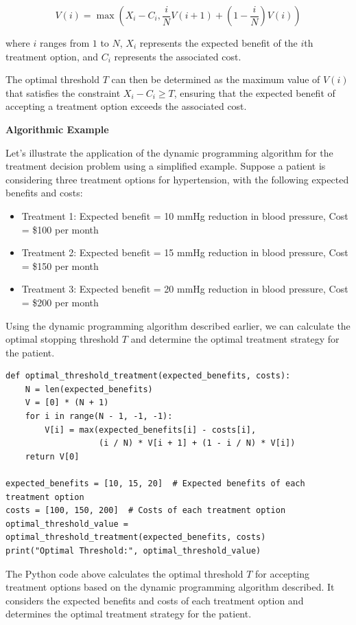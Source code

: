 \documentclass[12pt]{book} %
\begin{document}
\[
V(i) = \max\left(X_i - C_i, \frac{i}{N}V(i+1) + \left(1 - \frac{i}{N}\right)V(i)\right)
\]

where \(i\) ranges from \(1\) to \(N\), \(X_i\) represents the expected benefit of the \(i\)th treatment option, and \(C_i\) represents the associated cost.

The optimal threshold \(T\) can then be determined as the maximum value of \(V(i)\) that satisfies the constraint \(X_i - C_i \geq T\), ensuring that the expected benefit of accepting a treatment option exceeds the associated cost.

\textbf{Algorithmic Example}

Let's illustrate the application of the dynamic programming algorithm for the treatment decision problem using a simplified example. Suppose a patient is considering three treatment options for hypertension, with the following expected benefits and costs:

\begin{itemize}
    \item Treatment 1: Expected benefit = 10 mmHg reduction in blood pressure, Cost = \$100 per month
    \item Treatment 2: Expected benefit = 15 mmHg reduction in blood pressure, Cost = \$150 per month
    \item Treatment 3: Expected benefit = 20 mmHg reduction in blood pressure, Cost = \$200 per month
\end{itemize}

Using the dynamic programming algorithm described earlier, we can calculate the optimal stopping threshold \(T\) and determine the optimal treatment strategy for the patient.

\FloatBarrier
\begin{lstlisting}
def optimal_threshold_treatment(expected_benefits, costs):
    N = len(expected_benefits)
    V = [0] * (N + 1)
    for i in range(N - 1, -1, -1):
        V[i] = max(expected_benefits[i] - costs[i], 
                   (i / N) * V[i + 1] + (1 - i / N) * V[i])
    return V[0]

expected_benefits = [10, 15, 20]  # Expected benefits of each treatment option
costs = [100, 150, 200]  # Costs of each treatment option
optimal_threshold_value = optimal_threshold_treatment(expected_benefits, costs)
print("Optimal Threshold:", optimal_threshold_value)
\end{lstlisting}
\FloatBarrier
The Python code above calculates the optimal threshold \(T\) for accepting treatment options based on the dynamic programming algorithm described. It considers the expected benefits and costs of each treatment option and determines the optimal treatment strategy for the patient.
\end{document}
